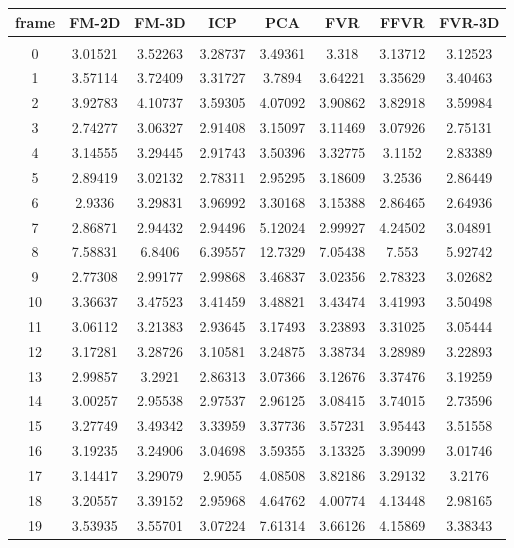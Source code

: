 \begin{center}
\begin{longtable}{cccccccc}
\hline
\textbf{frame} & \textbf{FM-2D} & \textbf{FM-3D} & \textbf{ICP} & \textbf{PCA} & \textbf{FVR} & \textbf{FFVR} & \textbf{FVR-3D} \\
\hline \\
0 & 3.01521 & 3.52263 & 3.28737 & 3.49361 & 3.318 & 3.13712 & 3.12523\\
1 & 3.57114 & 3.72409 & 3.31727 & 3.7894 & 3.64221 & 3.35629 & 3.40463\\
2 & 3.92783 & 4.10737 & 3.59305 & 4.07092 & 3.90862 & 3.82918 & 3.59984\\
3 & 2.74277 & 3.06327 & 2.91408 & 3.15097 & 3.11469 & 3.07926 & 2.75131\\
4 & 3.14555 & 3.29445 & 2.91743 & 3.50396 & 3.32775 & 3.1152 & 2.83389\\
5 & 2.89419 & 3.02132 & 2.78311 & 2.95295 & 3.18609 & 3.2536 & 2.86449\\
6 & 2.9336 & 3.29831 & 3.96992 & 3.30168 & 3.15388 & 2.86465 & 2.64936\\
7 & 2.86871 & 2.94432 & 2.94496 & 5.12024 & 2.99927 & 4.24502 & 3.04891\\
8 & 7.58831 & 6.8406 & 6.39557 & 12.7329 & 7.05438 & 7.553 & 5.92742\\
9 & 2.77308 & 2.99177 & 2.99868 & 3.46837 & 3.02356 & 2.78323 & 3.02682\\
10 & 3.36637 & 3.47523 & 3.41459 & 3.48821 & 3.43474 & 3.41993 & 3.50498\\
11 & 3.06112 & 3.21383 & 2.93645 & 3.17493 & 3.23893 & 3.31025 & 3.05444\\
12 & 3.17281 & 3.28726 & 3.10581 & 3.24875 & 3.38734 & 3.28989 & 3.22893\\
13 & 2.99857 & 3.2921 & 2.86313 & 3.07366 & 3.12676 & 3.37476 & 3.19259\\
14 & 3.00257 & 2.95538 & 2.97537 & 2.96125 & 3.08415 & 3.74015 & 2.73596\\
15 & 3.27749 & 3.49342 & 3.33959 & 3.37736 & 3.57231 & 3.95443 & 3.51558\\
16 & 3.19235 & 3.24906 & 3.04698 & 3.59355 & 3.13325 & 3.39099 & 3.01746\\
17 & 3.14417 & 3.29079 & 2.9055 & 4.08508 & 3.82186 & 3.29132 & 3.2176\\
18 & 3.20557 & 3.39152 & 2.95968 & 4.64762 & 4.00774 & 4.13448 & 2.98165\\
19 & 3.53935 & 3.55701 & 3.07224 & 7.61314 & 3.66126 & 4.15869 & 3.38343\\

\end{longtable}
\end{center}

